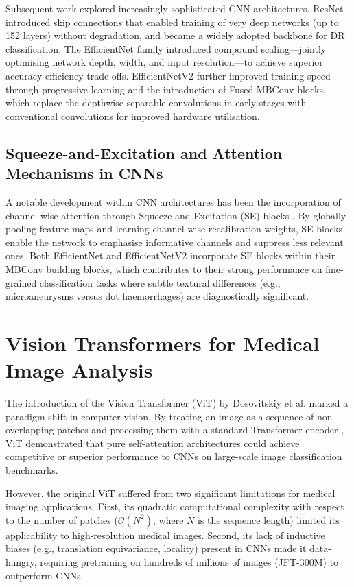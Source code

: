 Subsequent work explored increasingly sophisticated CNN architectures. ResNet \cite{he2016deep} introduced skip connections that enabled training of very deep networks (up to 152 layers) without degradation, and became a widely adopted backbone for DR classification. The EfficientNet family \cite{tan2019efficientnet} introduced compound scaling---jointly optimising network depth, width, and input resolution---to achieve superior accuracy-efficiency trade-offs. EfficientNetV2 \cite{tan2021efficientnetv2} further improved training speed through progressive learning and the introduction of Fused-MBConv blocks, which replace the depthwise separable convolutions in early stages with conventional convolutions for improved hardware utilisation.

\subsection{Squeeze-and-Excitation and Attention Mechanisms in CNNs}

A notable development within CNN architectures has been the incorporation of channel-wise attention through Squeeze-and-Excitation (SE) blocks \cite{hu2018squeeze}. By globally pooling feature maps and learning channel-wise recalibration weights, SE blocks enable the network to emphasise informative channels and suppress less relevant ones. Both EfficientNet and EfficientNetV2 incorporate SE blocks within their MBConv building blocks, which contributes to their strong performance on fine-grained classification tasks where subtle textural differences (e.g., microaneurysms versus dot haemorrhages) are diagnostically significant.

\section{Vision Transformers for Medical Image Analysis}
\label{sec:vit_medical}

The introduction of the Vision Transformer (ViT) by Dosovitskiy et al. \cite{dosovitskiy2021image} marked a paradigm shift in computer vision. By treating an image as a sequence of non-overlapping patches and processing them with a standard Transformer encoder \cite{vaswani2017attention}, ViT demonstrated that pure self-attention architectures could achieve competitive or superior performance to CNNs on large-scale image classification benchmarks.

However, the original ViT suffered from two significant limitations for medical imaging applications. First, its quadratic computational complexity with respect to the number of patches ($\mathcal{O}(N^2)$, where $N$ is the sequence length) limited its applicability to high-resolution medical images. Second, its lack of inductive biases (e.g., translation equivariance, locality) present in CNNs made it data-hungry, requiring pretraining on hundreds of millions of images (JFT-300M) to outperform CNNs.

